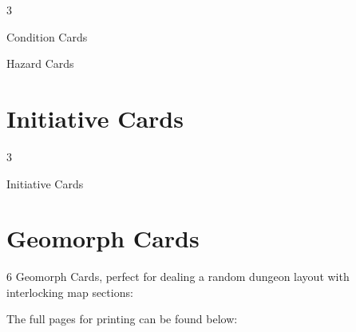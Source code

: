 \documentclass[10pt,a4paper,twoside,bg=print,twocolumn,openany,nodeprecatedcode]{dndbook}
\begin{document}
\begin{itemize}
\begin{multicols}{3}
\item Condition Cards
\item Hazard Cards
\end{multicols}

\end{itemize}

\section{Initiative Cards}

\begin{itemize}
\begin{multicols}{3}
\item Initiative Cards
\end{multicols}

\end{itemize}

\section{Geomorph Cards}
6 Geomorph Cards, perfect for dealing a random dungeon layout with interlocking map sections:


The full pages for printing can be found below:
\end{document}
